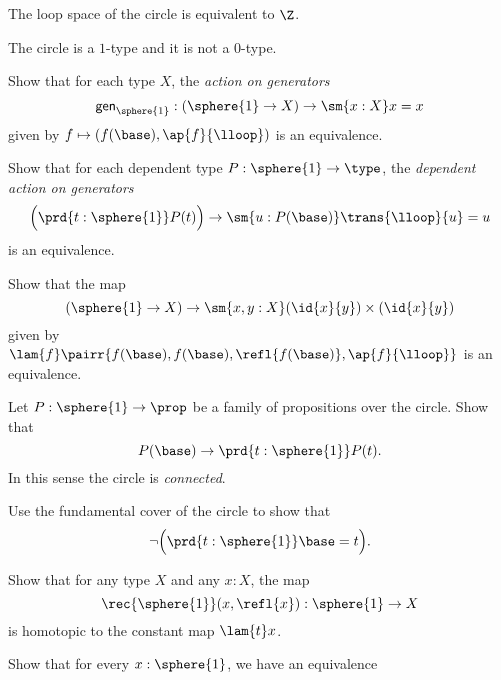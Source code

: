 \begin{cor}
The loop space of the circle is equivalent to $\Z$.
\end{cor}

\begin{cor}
The circle is a $1$-type and it is not a $0$-type.
\end{cor}

\begin{exercises}
\item \label{ex:circle_up} Show that for each type $X$, the \emph{action on generators}
\begin{equation*}
\mathsf{gen}_{\sphere{1}}:(\sphere{1}\to X)\to \sm{x:X}x=x
\end{equation*}
given by $f\mapsto (f(\base),\ap{f}{\lloop})$ is an equivalence.
\item \label{ex:circle_dup} Show that for each dependent type $P:\sphere{1}\to\type$, the \emph{dependent action on generators}
\begin{equation*}
\Big(\prd{t:\sphere{1}}P(t)\Big)\to \sm{u:P(\base)}\trans{\lloop}{u}=u
\end{equation*}
is an equivalence.
\item Show that the map
\begin{equation*}
(\sphere{1}\to X)\to \sm{x,y:X} (\id{x}{y})\times(\id{x}{y})
\end{equation*}
given by $\lam{f}\pairr{f(\base),f(\base),\refl{f(\base)},\ap{f}{\lloop}}$ is an equivalence.
\item Let $P:\sphere{1}\to\prop$ be a family of propositions over the circle. Show that
\begin{equation*}
P(\base)\to\prd{t:\sphere{1}}P(t).
\end{equation*}
In this sense the circle is \emph{connected}.
\item Use the fundamental cover of the circle to show that
\begin{equation*}
\neg\Big(\prd{t:\sphere{1}}\base=t\Big).
\end{equation*}
\item \label{ex:circle_constant}
Show that for any type $X$ and any $x:X$, the map
\begin{equation*}
\rec{\sphere{1}}(x,\refl{x}):\sphere{1}\to X
\end{equation*}
is homotopic to the constant map $\lam{t}x$.
\item \label{ex:circle_degk}
\begin{subexenum}
\item Show that for every $x:\sphere{1}$, we have an equivalence

\end{subexenum}
\end{exercises}
